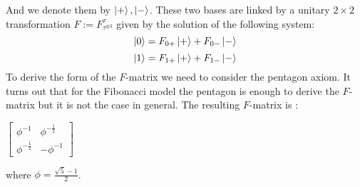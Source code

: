 \documentclass{article}
\begin{document}
\begin{center}
	\quad
\end{center}
And we denote them by $\ket{+}, \ket{-}$. These two bases are linked by a unitary $2 \times 2$ transformation $F:= F^\tau_{\tau^{\otimes 3}}$ given by the solution of the following system:
$$ \ket{0} = F_{0+} \ket{+} + F_{0-} \ket{-}$$
$$ \ket{1} = F_{1+} \ket{+} + F_{1-} \ket{-}$$
To derive the form of the $F$-matrix we need to consider the pentagon axiom. It turns out that for the Fibonacci model the pentagon is enough to derive the $F$-matrix but it is not the case in general. The resulting $F$-matrix is \cite{Simon16}:
\begin{center}
	$\begin{bmatrix}
	\phi^{-1} & \phi^{-\frac{1}{2}} \\
	\phi^{-\frac{1}{2}} & -\phi^{-1}
	\end{bmatrix}$
\end{center}
where $\phi = \frac{\sqrt{5}-1}{2}$.
\end{document}
